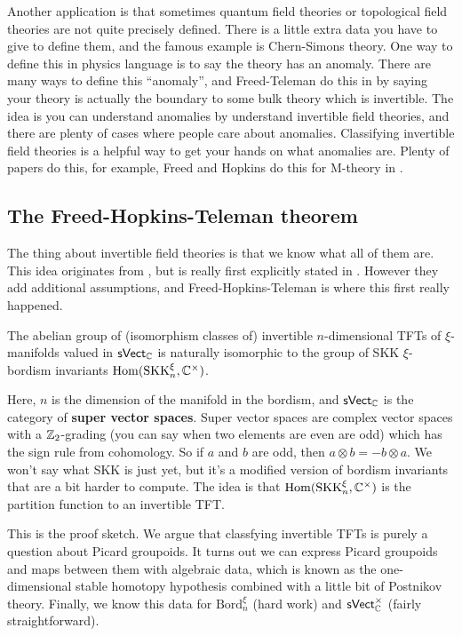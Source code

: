 Another application is that sometimes quantum field theories or topological field theories are not quite precisely defined. There is a little extra data you have to give to define them, and the famous example is Chern-Simons theory. One way to define this in physics language is to say the theory has an anomaly. There are many ways to define this ``anomaly'', and Freed-Teleman do this in \cite{ft} by saying your theory is actually the boundary to some bulk theory which is invertible. The idea is you can understand anomalies by understand invertible field theories, and there are plenty of cases where people care about anomalies. Classifying invertible field theories is a helpful way to get your hands on what anomalies are. Plenty of papers do this, for example, Freed and Hopkins do this for M-theory in \cite{fh2}.

\subsection*{The Freed-Hopkins-Teleman theorem} 
The thing about invertible field theories is that we know what all of them are. This idea originates from \cite{fht}, but is really first explicitly stated in \cite{fh}. However they add additional assumptions, and Freed-Hopkins-Teleman is where this first really happened.

\begin{theorem}\label{fhtt} 
    The abelian group of (isomorphism classes of) invertible $n$-dimensional TFTs of $\xi$-manifolds valued in $\mathsf{sVect} _{\mathbb{C}}$ is naturally isomorphic to the group of SKK $\xi$-bordism invariants $\operatorname{Hom}(\mathrm{SKK}_n ^{\xi},\mathbb{C}^{\times })$.
\end{theorem}
Here, $n$ is the dimension of the manifold in the bordism, and $\mathsf{sVect} _{\mathbb{C}}$ is the category of \textbf{super vector spaces}. Super vector spaces are complex vector spaces with a $\mathbb{Z}_2$-grading (you can say when two elements are even are odd) which has the sign rule from cohomology. So if $a$ and $b$ are odd, then $a\otimes b = - b \otimes a$. We won't say what SKK is just yet, but it's a modified version of bordism invariants that are a bit harder to compute. The idea is that $\operatorname{Hom} (\mathrm{SKK}_n^{\xi} ,\mathbb{C}^{\times })$ is the partition function to an invertible TFT.

This is the proof sketch. We argue that classfying invertible TFTs is purely a question about Picard groupoids. It turns out we can express Picard groupoids and maps between them with algebraic data, which is known as the one-dimensional stable homotopy hypothesis combined with a little bit of Postnikov theory. Finally, we know this data for $\mathrm{Bord}_n ^{\xi}$ (hard work) and $\mathsf{sVect} _{\mathbb{C}}^{\times }$ (fairly straightforward).

